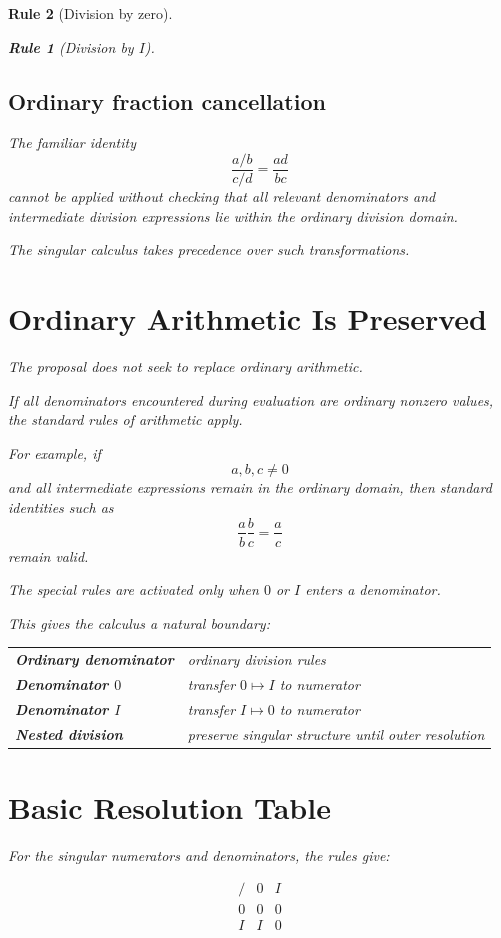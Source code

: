 \documentclass[11pt,a4paper]{article}
\newtheorem{rulethm}{Rule}[section]
\begin{document}
\begin{rulethm}[Division by zero]
\begin{rulethm}[Division by $I$]
\subsection{Ordinary fraction cancellation}

The familiar identity
\[
\frac{a/b}{c/d}=\frac{ad}{bc}
\]
cannot be applied without checking that all relevant denominators and
intermediate division expressions lie within the ordinary division domain.

The singular calculus takes precedence over such transformations.

\section{Ordinary Arithmetic Is Preserved}

The proposal does not seek to replace ordinary arithmetic.

If all denominators encountered during evaluation are ordinary nonzero
values, the standard rules of arithmetic apply.

For example, if
\[
a,b,c\neq0
\]
and all intermediate expressions remain in the ordinary domain, then
standard identities such as
\[
\frac{a}{b}\frac{b}{c}=\frac{a}{c}
\]
remain valid.

The special rules are activated only when $0$ or $I$ enters a denominator.

This gives the calculus a natural boundary:

\begin{center}
\begin{tabular}{ll}
\toprule
\textbf{Ordinary denominator} & ordinary division rules \\
\textbf{Denominator $0$} & transfer $0\mapsto I$ to numerator \\
\textbf{Denominator $I$} & transfer $I\mapsto0$ to numerator \\
\textbf{Nested division} & preserve singular structure until outer resolution \\
\bottomrule
\end{tabular}
\end{center}

\section{Basic Resolution Table}

For the singular numerators and denominators, the rules give:

\[
\begin{array}{c|cc}
/ & 0 & I\\
\hline
0 & 0 & 0\\
I & I & 0
\end{array}
\]


\end{rulethm}
\end{rulethm}
\end{document}
